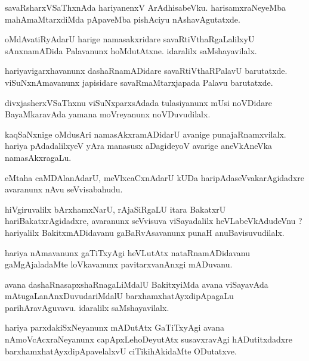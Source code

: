 \documentclass{article}
\begin{document}
\begin{mn}
savaRsharxVSaThxnAda hariyanenxV ArAdhisabeVku. harisamxraNeyeMba mahAmaMtarxdiMda pApaveMba 
pishAciyu nAshavAgutatxde.
\end{mn}

\begin{mn}
oMdAvatiRyAdarU harige namasakxridare savaRtiVthaRgaLalilxyU sAnxnamADida Palavanunx hoMdutAtxne. 
idaralilx saMshayavilalx.
\end{mn}

\begin{mn}
hariyavigarxhavanunx dashaRnamADidare savaRtiVthaRPalavU barutatxde. viSuNxnAmavanunx japisidare 
savaRmaMtarxjapada Palavu barutatxde.
\end{mn}

\begin{mn}
divxjasherxVSaThxnu viSuNxparxsAdada tulasiyanunx mUsi noVDidare BayaMkaravAda yamana moVreyanunx 
noVDuvudilalx.
\end{mn}

\begin{mn}
kaqSaNxnige oMdusAri namasAkxramADidarU avanige punajaRnamxvilalx. hariya pAdadalilxyeV yAra 
manasusx aDagideyoV avarige aneVkAneVka namasAkxragaLu.
\end{mn}

\begin{mn}
eMtaha caMDAlanAdarU, meVlxcaCxnAdarU kUDa haripAdaseVvakarAgidadxre avaranunx nAvu seVvisabahudu.
\end{mn}

\begin{mn}
hiVgiruvalilx bArxhamxNarU, rAjaSiRgaLU itara BakatxrU hariBakatxrAgidadxre, avaranunx seVvisuva 
viSayadalilx heVLabeVkAdudeVnu ? hariyalilx BakitxmADidavanu gaBaRvAsavanunx punaH 
anuBavisuvudilalx.
\end{mn}

\begin{mn}
hariya nAmavanunx gaTiTxyAgi heVLutAtx nataRnamADidavanu gaMgAjaladaMte loVkavanunx 
pavitarxvanAnxgi mADuvanu.
\end{mn}

\begin{mn}
avana dashaRnasapxshaRnagaLiMdalU BakitxyiMda avana viSayavAda mAtugaLanAnxDuvudariMdalU 
barxhamxhatAyxdipApagaLu parihAravAguvavu. idaralilx saMshayavilalx. 
\end{mn}

\begin{mn}
hariya parxdakiSxNeyanunx mADutAtx GaTiTxyAgi avana nAmoVcAcxraNeyanunx capApxLehoDeyutAtx 
susavxravAgi hADutitxdadxre barxhamxhatAyxdipApavelalxvU ciTikihAkidaMte ODutatxve.
\end{mn}
\end{document}
